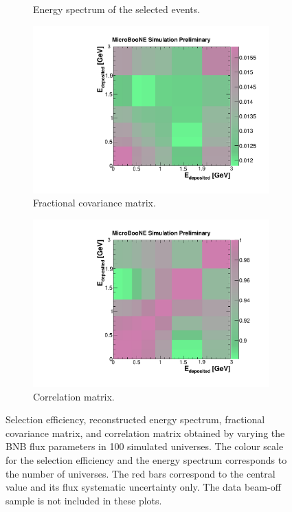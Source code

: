 \begin{figure}[htbp]
\begin{center}
\begin{subfigure}{0.49\textwidth}
      \caption{Energy spectrum of the selected events.}  \label{fig:reco_flux}
    \end{subfigure}
    \begin{subfigure}{0.49\textwidth}
      \includegraphics[width=\linewidth]{figures/frac_flux.pdf}
      \caption{Fractional covariance matrix.}  \label{fig:frac_flux}
    \end{subfigure}\hfill
    \begin{subfigure}{0.49\textwidth}
      \includegraphics[width=\linewidth]{figures/corr_flux.pdf}
      \caption{Correlation matrix.}  \label{fig:corr_flux}
    \end{subfigure}
    \caption{Selection efficiency, reconstructed energy spectrum, fractional covariance matrix, and correlation matrix obtained by varying the BNB flux parameters in 100 simulated universes. The colour scale for the selection efficiency and the energy spectrum corresponds to the number of universes. The red bars correspond to the central value and its flux systematic uncertainty only. The data beam-off sample is not included in these plots.}\label{fig:flux_sys}
	\end{center}
\end{figure}


